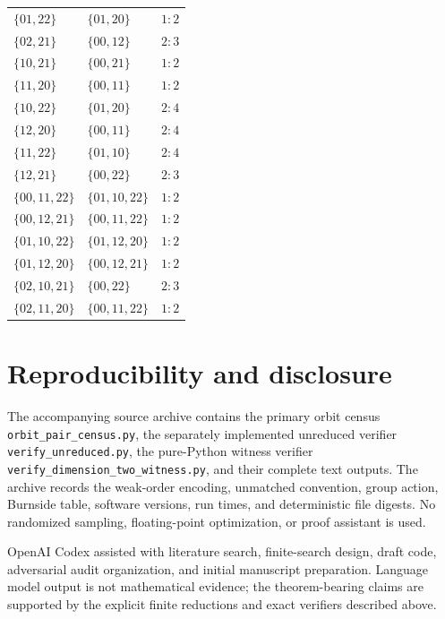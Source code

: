\documentclass[11pt]{article}
\begin{document}
\begin{longtable}{@{}lll@{}}
$\{01,22\}$&$\{01,20\}$&$1:2$\\
$\{02,21\}$&$\{00,12\}$&$2:3$\\
$\{10,21\}$&$\{00,21\}$&$1:2$\\
$\{11,20\}$&$\{00,11\}$&$1:2$\\
$\{10,22\}$&$\{01,20\}$&$2:4$\\
$\{12,20\}$&$\{00,11\}$&$2:4$\\
$\{11,22\}$&$\{01,10\}$&$2:4$\\
$\{12,21\}$&$\{00,22\}$&$2:3$\\
$\{00,11,22\}$&$\{01,10,22\}$&$1:2$\\
$\{00,12,21\}$&$\{00,11,22\}$&$1:2$\\
$\{01,10,22\}$&$\{01,12,20\}$&$1:2$\\
$\{01,12,20\}$&$\{00,12,21\}$&$1:2$\\
$\{02,10,21\}$&$\{00,22\}$&$2:3$\\
$\{02,11,20\}$&$\{00,11,22\}$&$1:2$\\
\bottomrule
\end{longtable}

\section*{Reproducibility and disclosure}

The accompanying source archive contains the primary orbit census
\texttt{orbit\_pair\_census.py}, the separately implemented unreduced verifier
\texttt{verify\_unreduced.py}, the pure-Python witness verifier
\texttt{verify\_dimension\_two\_witness.py}, and their complete text outputs.
The archive records the weak-order encoding, unmatched convention, group
action, Burnside table, software versions, run times, and deterministic file
digests.  No randomized sampling, floating-point optimization, or proof
assistant is used.

OpenAI Codex assisted with literature search, finite-search design, draft code,
adversarial audit organization, and initial manuscript preparation.  Language
model output is not mathematical evidence; the theorem-bearing claims are
supported by the explicit finite reductions and exact verifiers described
above.



\end{document}
